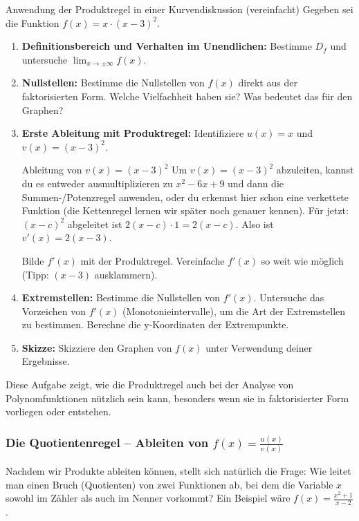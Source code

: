 \begin{aufgabenumgebung}[A:ProduktregelAnwendung]{Anwendung der Produktregel in einer Kurvendiskussion (vereinfacht)}
Gegeben sei die Funktion $f(x) = x \cdot (x-3)^2$.
\begin{enumerate}
    \item \textbf{Definitionsbereich und Verhalten im Unendlichen:} Bestimme $D_f$ und untersuche $\lim_{x \to \pm\infty} f(x)$.
    \item \textbf{Nullstellen:} Bestimme die Nullstellen von $f(x)$ direkt aus der faktorisierten Form. Welche Vielfachheit haben sie? Was bedeutet das für den Graphen?
    \item \textbf{Erste Ableitung mit Produktregel:}
        Identifiziere $u(x)=x$ und $v(x)=(x-3)^2$. 
        \begin{tippumgebung}{Ableitung von $v(x)=(x-3)^2$}
        Um $v(x)=(x-3)^2$ abzuleiten, kannst du es entweder ausmultiplizieren zu $x^2-6x+9$ und dann die Summen-/Potenzregel anwenden, oder du erkennst hier schon eine verkettete Funktion (die Kettenregel lernen wir später noch genauer kennen). Für jetzt: $(x-c)^2$ abgeleitet ist $2(x-c)\cdot 1 = 2(x-c)$. Also ist $v'(x) = 2(x-3)$.
        \end{tippumgebung}
        Bilde $f'(x)$ mit der Produktregel. Vereinfache $f'(x)$ so weit wie möglich (Tipp: $(x-3)$ ausklammern).
    \item \textbf{Extremstellen:} Bestimme die Nullstellen von $f'(x)$. Untersuche das Vorzeichen von $f'(x)$ (Monotonieintervalle), um die Art der Extremstellen zu bestimmen. Berechne die y-Koordinaten der Extrempunkte.
    \item \textbf{Skizze:} Skizziere den Graphen von $f(x)$ unter Verwendung deiner Ergebnisse.
\end{enumerate}
Diese Aufgabe zeigt, wie die Produktregel auch bei der Analyse von Polynomfunktionen nützlich sein kann, besonders wenn sie in faktorisierter Form vorliegen oder entstehen.
\end{aufgabenumgebung}

\subsubsection{Die Quotientenregel – Ableiten von $f(x) = \frac{u(x)}{v(x)}$}
\label{subsubsec:quotientenregel}

Nachdem wir Produkte ableiten können, stellt sich natürlich die Frage: Wie leitet man einen Bruch (Quotienten) von zwei Funktionen ab, bei dem die Variable $x$ sowohl im Zähler als auch im Nenner vorkommt? Ein Beispiel wäre $f(x) = \frac{x^2+1}{x-2}$.

